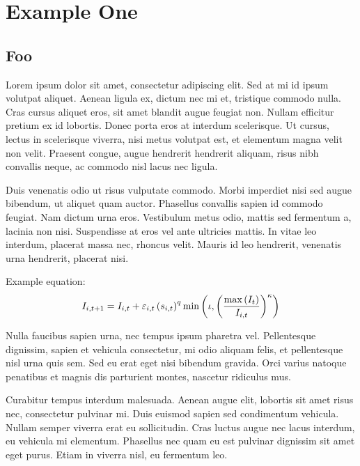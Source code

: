 \chapter{Example One}

\section{Foo}

Lorem ipsum dolor sit amet, consectetur adipiscing elit. Sed at mi id ipsum volutpat aliquet. Aenean ligula ex, dictum nec mi et, tristique commodo nulla. Cras cursus aliquet eros, sit amet blandit augue feugiat non. Nullam efficitur pretium ex id lobortis. Donec porta eros at interdum scelerisque. Ut cursus, lectus in scelerisque viverra, nisi metus volutpat est, et elementum magna velit non velit. Praesent congue, augue hendrerit hendrerit aliquam, risus nibh convallis neque, ac commodo nisl lacus nec ligula.

Duis venenatis odio ut risus vulputate commodo. Morbi imperdiet nisi sed augue bibendum, ut aliquet quam auctor. Phasellus convallis sapien id commodo feugiat. Nam dictum urna eros. Vestibulum metus odio, mattis sed fermentum a, lacinia non nisi. Suspendisse at eros vel ante ultricies mattis. In vitae leo interdum, placerat massa nec, rhoncus velit. Mauris id leo hendrerit, venenatis urna hendrerit, placerat nisi.

Example equation:
\begin{equation}\label{eq:individualprod}
  I_{i,t+1}=I_{i,t}+\varepsilon_{i,t}\left(s_{i,t}\right)^{q}\min\left(\iota,\left(\frac{\max\left(I_{t}\right)}{I_{i,t}}\right)^{\kappa}\right)
\end{equation}

Nulla faucibus sapien urna, nec tempus ipsum pharetra vel. Pellentesque dignissim, sapien et vehicula consectetur, mi odio aliquam felis, et pellentesque nisl urna quis sem. Sed eu erat eget nisi bibendum gravida. Orci varius natoque penatibus et magnis dis parturient montes, nascetur ridiculus mus.

Curabitur tempus interdum malesuada. Aenean augue elit, lobortis sit amet risus nec, consectetur pulvinar mi. Duis euismod sapien sed condimentum vehicula. Nullam semper viverra erat eu sollicitudin. Cras luctus augue nec lacus interdum, eu vehicula mi elementum. Phasellus nec quam eu est pulvinar dignissim sit amet eget purus. Etiam in viverra nisl, eu fermentum leo.

